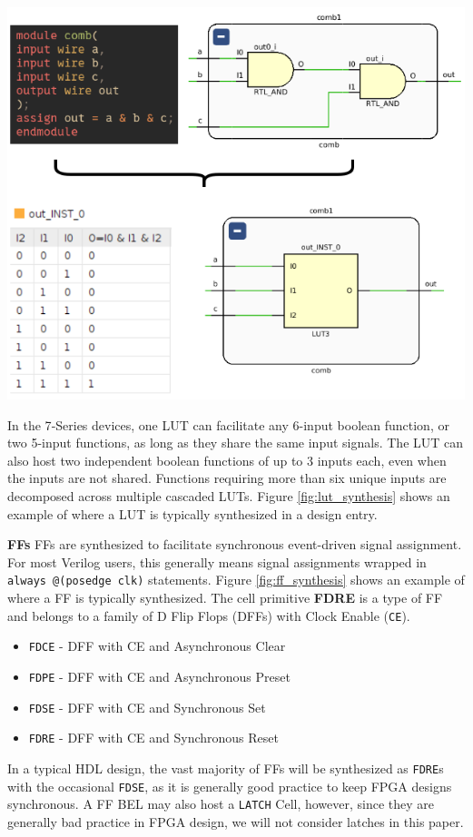 \begin{multicols}{2}
{
    \centering
    \includegraphics[width=\columnwidth]{figures/lut_synthesis.png}
    \label{fig:lut_synthesis}
}
\vspace{1.0cm}

In the 7‑Series devices, one LUT can facilitate any 6-input boolean function, or two 5-input functions, as long as they share the same input signals.  
The LUT can also host two independent boolean functions of up to 3 inputs each, even when the inputs are not shared.  
Functions requiring more than six unique inputs are decomposed across multiple cascaded LUTs.
Figure \ref{fig:lut_synthesis} shows an example of where a LUT is typically synthesized in a design entry. 


\textbf{FFs} \quad
FFs are synthesized to facilitate synchronous event-driven signal assignment. 
For most Verilog users, this generally means signal assignments wrapped in \texttt{always @(posedge clk)} statements. 
Figure \ref{fig:ff_synthesis} shows an example of where a FF is typically synthesized. 
The cell primitive \textbf{FDRE} is a type of FF and belongs to a family of D Flip Flops (DFFs) with Clock Enable (\texttt{CE}). 
\begin{itemize}
\item \texttt{FDCE} - DFF with CE and Asynchronous Clear
\item \texttt{FDPE} - DFF with CE and Asynchronous Preset
\item \texttt{FDSE} - DFF with CE and Synchronous Set
\item \texttt{FDRE} - DFF with CE and Synchronous Reset
\end{itemize}
In a typical HDL design, the vast majority of FFs will be synthesized as \texttt{FDRE}s with the occasional \texttt{FDSE}, as it is generally good practice to keep FPGA designs synchronous. 
A FF BEL may also host a \texttt{LATCH} Cell, however, since they are generally bad practice in FPGA design, we will not consider latches in this paper. 


\end{multicols}

